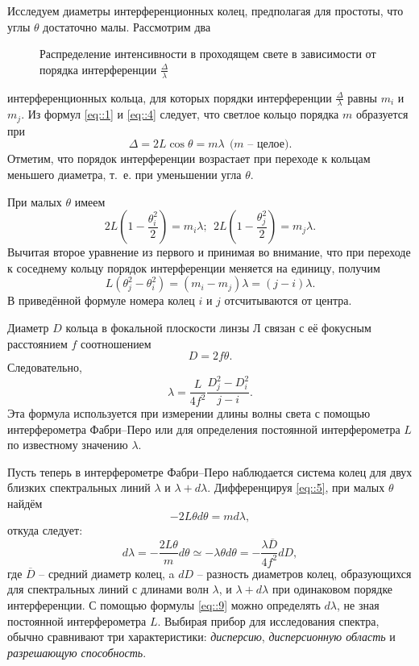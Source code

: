 Исследуем диаметры интерференционных
колец, предполагая для простоты, что углы $\theta$ достаточно малы. Рассмотрим два
\begin{figure}[h!]
  \caption{Распределение интенсивности в проходящем свете в зависимости от порядка интерференции $\frac{\Delta}{\lambda}$}
  \label{img::2}
\end{figure}
\noindent интерференционных кольца, для которых порядки 
интерференции $\frac{\Delta}{\lambda}$ равны $m_i$ и $m_j$. Из формул \eqref{eq::1} и 
\eqref{eq::4} следует, что светлое кольцо порядка $m$ образуется при
\begin{equation}\label{eq::5}
  \Delta = 2L\cos{\theta} = m\lambda \: \: 
  \text{($m$ -- целое).}
\end{equation}
\noindent Отметим, что порядок интерференции возрастает при переходе к
кольцам меньшего диаметра, т.~е. при уменьшении угла $\theta$.

При малых $\theta$ имеем
\begin{equation}\label{eq::6}
  2L\left(1 - \frac{\theta_i^2}{2}\right) = m_i\lambda; \: \:
  2L\left(1 - \frac{\theta_j^2}{2}\right) = m_j\lambda.
\end{equation}
\noindent Вычитая второе уравнение из первого и принимая во внимание, 
что при переходе к соседнему кольцу порядок интерференции 
меняется на единицу, получим
$$
L\left(\theta_j^2 - \theta_i^2\right) = 
\left(m_i - m_j\right)\lambda = \left(j - i\right)\lambda.
$$
\noindent В приведённой формуле номера колец $i$ и $j$ отсчитываются от центра.

Диаметр $D$ кольца в фокальной плоскости линзы $Л$ связан с её 
фокусным расстоянием $f$ соотношением
\begin{equation}\label{eq::7}
  D = 2f\theta.
\end{equation}
\noindent Следовательно,
\begin{equation}\label{eq::8}
  \lambda = \frac{L}{4f^2}\frac{D_j^2 - D_i^2}{j - i}.
\end{equation}
\noindent Эта формула используется при измерении длины волны 
света с помощью интерферометра Фабри–Перо или для определения 
постоянной интерферометра $L$ по известному значению $\lambda$.

Пусть теперь в интерферометре Фабри–Перо наблюдается система
колец для двух близких спектральных линий $\lambda$ и $\lambda+d\lambda$. 
Дифференцируя \eqref{eq::5}, при малых $\theta$ найдём
$$
-2L\theta d \theta = md\lambda,
$$
\noindent откуда следует:
\begin{equation}\label{eq::9}
  d\lambda = - \frac{2L\theta}{m}d\theta \simeq -\lambda\theta d\theta 
  = - \frac{\lambda\overline{D}}{4f^2}dD,
\end{equation}
\noindent где $\overline{D}$ -- средний диаметр колец, a $dD$
-- разность диаметров колец, образующихся для спектральных линий 
с длинами волн $\lambda$, и $\lambda + d\lambda$ при одинаковом 
порядке интерференции. С помощью формулы \eqref{eq::9} можно
определять $d\lambda$, не зная постоянной интерферометра $L$.
Выбирая прибор для исследования спектра, обычно сравнивают три
характеристики: \textit{дисперсию}, \textit{дисперсионную область} и
\textit{разрешающую способность}.